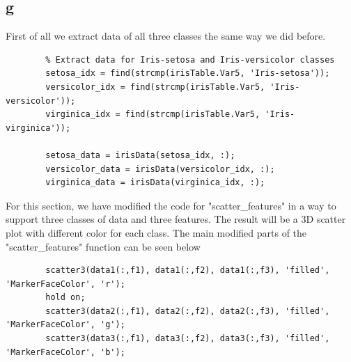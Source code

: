 \documentclass[]{article}
\begin{document}
	\subsection*{g}
	First of all we extract data of all three classes the same way we did before. 
	\begin{lstlisting}
		% Extract data for Iris-setosa and Iris-versicolor classes
		setosa_idx = find(strcmp(irisTable.Var5, 'Iris-setosa'));
		versicolor_idx = find(strcmp(irisTable.Var5, 'Iris-versicolor'));
		virginica_idx = find(strcmp(irisTable.Var5, 'Iris-virginica'));
		
		setosa_data = irisData(setosa_idx, :);
		versicolor_data = irisData(versicolor_idx, :);
		virginica_data = irisData(virginica_idx, :);
	\end{lstlisting}
	For this section, we have modified the code for "scatter\_features" in a way to support three classes of data and three features. The result will be a 3D scatter plot with different color for each class. The main modified parts of the "scatter\_features" function can be seen below
	\begin{lstlisting}
		scatter3(data1(:,f1), data1(:,f2), data1(:,f3), 'filled', 'MarkerFaceColor', 'r');
		hold on;
		scatter3(data2(:,f1), data2(:,f2), data2(:,f3), 'filled', 'MarkerFaceColor', 'g');
		scatter3(data3(:,f1), data3(:,f2), data3(:,f3), 'filled', 'MarkerFaceColor', 'b');
	\end{lstlisting}
\end{document}
